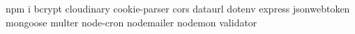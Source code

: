 npm i bcrypt cloudinary cookie-parser cors dataurl dotenv express jsonwebtoken mongoose multer node-cron nodemailer nodemon validator